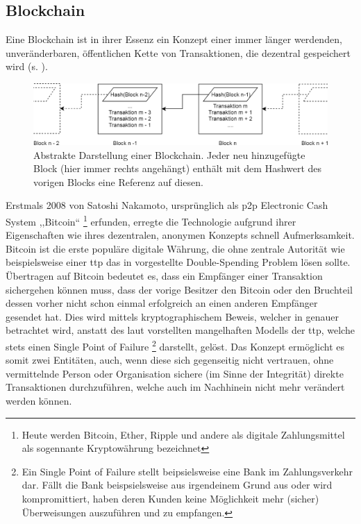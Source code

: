 \subsection{Blockchain}
\label{sec:sota_blockchain}
    Eine Blockchain ist in ihrer Essenz ein Konzept einer immer länger werdenden, unveränderbaren, öffentlichen Kette von Transaktionen, die dezentral gespeichert wird (s. ). 
    \smallskip
    \begin{figure}[H]
    	\centering
    	\includegraphics[width=\textwidth]{graphics/bc_highlvl.png}
    	\caption[Abstrakte Darstellung einer Blockchain]{Abstrakte Darstellung einer Blockchain. Jeder neu hinzugefügte Block (hier immer rechts angehängt) enthält mit dem Hashwert des vorigen Blocks eine Referenz auf diesen.}
    	\label{fig:bc_highlvl}
    \end{figure}
    \noindent Erstmals 2008 von Satoshi Nakamoto, ursprünglich als \gls{p2p} Electronic Cash System ,,Bitcoin``
    \!\footnote{Heute werden Bitcoin, Ether, Ripple und andere als digitale Zahlungsmittel als sogennante Kryptowährung bezeichnet} 
    erfunden, erregte die Technologie aufgrund ihrer Eigenschaften wie ihres dezentralen, anonymen Konzepts schnell Aufmerksamkeit\cite{Underwood2016}.
    Bitcoin ist die erste populäre digitale Währung, die ohne zentrale Autorität wie beispielsweise einer \gls{ttp} das in  vorgestellte Double-Spending Problem lösen sollte\cite{Nakamoto2008}. 
    Übertragen auf Bitcoin bedeutet es, dass ein Empfänger einer Transaktion sichergehen können muss, dass der vorige Besitzer den Bitcoin oder den Bruchteil dessen vorher nicht schon einmal erfolgreich an einen anderen Empfänger gesendet hat.
    Dies wird mittels kryptographischem Beweis, welcher in  genauer betrachtet wird, anstatt des laut \citeauthor{Nakamoto2008} vorstellten mangelhaften Modells der \gls{ttp}, welche stets einen Single Point of Failure
    \!\footnote{Ein Single Point of Failure stellt beipsielsweise eine Bank im Zahlungsverkehr dar.
    Fällt die Bank beispsielsweise aus irgendeinem Grund aus oder wird kompromittiert, haben deren Kunden keine Möglichkeit mehr (sicher) Überweisungen auszuführen und zu empfangen.}
    darstellt, gelöst. 
    Das Konzept ermöglicht es somit zwei Entitäten, auch, wenn diese sich gegenseitig nicht vertrauen, ohne vermittelnde Person oder Organisation sichere (im Sinne der Integrität) direkte Transaktionen  durchzuführen, welche auch im Nachhinein nicht mehr verändert werden können.\cite{Christidis2016}
    
